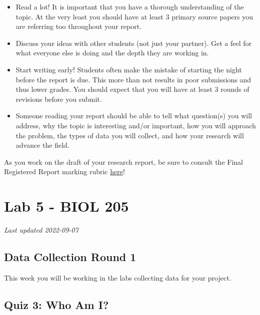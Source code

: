 \documentclass[
]{book}
\providecommand{\tightlist}{%
  \setlength{\itemsep}{0pt}\setlength{\parskip}{0pt}}
\begin{document}
\begin{itemize}
\tightlist
\item
  Read a lot! It is important that you have a thorough understanding of the topic. At the very least you should have at least 3 primary source papers you are referring too throughout your report.
\item
  Discuss your ideas with other students (not just your partner). Get a feel for what everyone else is doing and the depth they are working in.
\item
  Start writing early! Students often make the mistake of starting the night before the report is due. This more than not results in poor submissions and thus lower grades. You should expect that you will have at least 3 rounds of revisions before you submit.
\item
  Someone reading your report should be able to tell what question(s) you will address, why the topic is interesting and/or important, how you will approach the problem, the types of data you will collect, and how your research will advance the field.
\end{itemize}

As you work on the draft of your research report, be sure to consult the Final Registered Report marking rubric \href{https://ubco-biology.github.io/BIOL-205-Lab-Manual/registered-report-rubric.html}{here}!

\hypertarget{part-lab-5---biol-205}{%
\part*{Lab 5 - BIOL 205}\label{part-lab-5---biol-205}}

\emph{Last updated 2022-09-07}

\hypertarget{data-collection-round-1}{%
\chapter*{Data Collection Round 1}\label{data-collection-round-1}}

This week you will be working in the labs collecting data for your project.

\hypertarget{quiz-3-who-am-i}{%
\chapter*{Quiz 3: Who Am I?}\label{quiz-3-who-am-i}}
\end{document}
